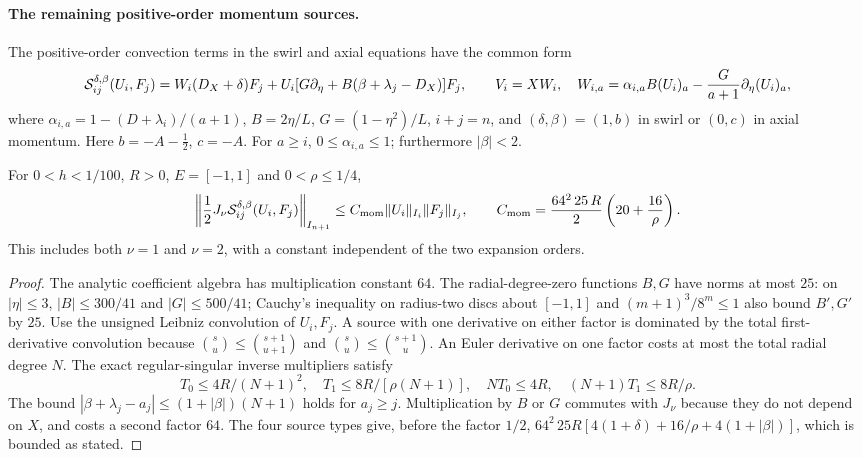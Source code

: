 \paragraph{The remaining positive-order momentum sources.}
The positive-order convection terms in the swirl and axial equations have the common form
\[
 {\cal S}^{\delta,\beta}_{ij}(U_i,F_j)
 =W_i(D_X+\delta)F_j+
 U_i[G\partial_\eta+B(\beta+\lambda_j-D_X)]F_j,\qquad
 V_i=XW_i,\quad
 W_{i,a}=\alpha_{i,a}B(U_i)_a-\frac G{a+1}\partial_\eta(U_i)_a,
\]
where $\alpha_{i,a}=1-(D+\lambda_i)/(a+1)$,
$B=2\eta/L$, $G=(1-\eta^2)/L$, $i+j=n$,
and $(\delta,\beta)=(1,b)$ in swirl or $(0,c)$ in axial
momentum. Here $b=-A-\frac12$, $c=-A$. For $a\ge i$,
$0\le\alpha_{i,a}\le1$; furthermore $|\beta|<2$.

\begin{theorem}
For $0<h<1/100$, $R>0$, $E=[-1,1]$ and $0<\rho\le1/4$,
\[
 \left\|\frac12J_\nu {\cal S}_{ij}^{\delta,\beta}(U_i,F_j)\right\|_{I_{n+1}}
 \le C_{\rm mom}\|U_i\|_{I_i}\|F_j\|_{I_j},
 \qquad C_{\rm mom}=\frac{64^2\,25\,R}{2}
 \left(20+\frac{16}{\rho}\right).
\]
This includes both $\nu=1$ and $\nu=2$, with a constant
independent of the two expansion orders.
\end{theorem}
\begin{proof}
The analytic coefficient algebra has multiplication constant $64$.
The radial-degree-zero functions $B,G$ have norms at most $25$:
on $|\eta|\le3$, $|B|\le300/41$ and $|G|\le500/41$;
Cauchy's inequality on radius-two discs about $[-1,1]$ and
$(m+1)^3/8^m\le1$ also bound $B',G'$ by $25$.
Use the unsigned Leibniz convolution of $U_i,F_j$.
A source with one derivative on either factor is dominated
by the total first-derivative convolution because
$\binom{s}{u}\le\binom{s+1}{u+1}$ and
$\binom{s}{u}\le\binom{s+1}{u}$.
An Euler derivative on one factor costs at most the total
radial degree $N$. The exact regular-singular inverse
multipliers satisfy
\[
 T_0\le 4R/(N+1)^2,\quad T_1\le8R/[\rho(N+1)],
 \quad NT_0\le4R,\quad (N+1)T_1\le8R/\rho.
\]
The bound $|\beta+\lambda_j-a_j|\le
(1+|\beta|)(N+1)$ holds for $a_j\ge j$.
Multiplication by $B$ or $G$ commutes with $J_\nu$ because
they do not depend on $X$, and costs a second factor $64$.
The four source types give, before the factor $1/2$,
$64^2\,25 R[4(1+\delta)+16/\rho+4(1+|\beta|)]$,
which is bounded as stated.
\end{proof}

